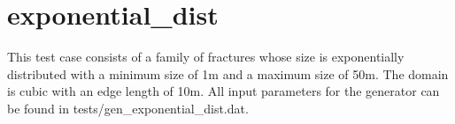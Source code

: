 \documentclass[letterpaper,10pt,english]{sphinxmanual}
\begin{document}
\begin{DUlineblock}{0em}
\item[] 
\item[] 
\end{DUlineblock}
\begin{figure}[htbp]
\centering

\noindent{}
\end{figure}

\begin{DUlineblock}{0em}
\item[] 
\item[] 
\end{DUlineblock}
\begin{figure}[htbp]
\centering

\noindent{}
\end{figure}


\section{exponential\_dist}
\label{\detokenize{tutorial:exponential-dist}}
This test case consists of a family of fractures whose size is exponentially distributed with a minimum size of 1m and a maximum size of 50m. The domain is cubic with an edge length of 10m. All input parameters for the generator can be found in tests/gen\_exponential\_dist.dat.
\begin{figure}[htbp]
\centering

\noindent{}
\end{figure}

\begin{DUlineblock}{0em}
\item[] 
\item[] 
\end{DUlineblock}
\begin{figure}[htbp]
\centering

\noindent{}
\end{figure}

\begin{DUlineblock}{0em}
\item[] 
\item[] 
\end{DUlineblock}
\begin{figure}[htbp]
\centering

\noindent{}
\end{figure}
\end{document}
